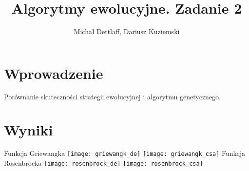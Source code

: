 \documentclass[11pt]{article}
\begin{document}
\title{Algorytmy ewolucyjne. Zadanie 2}
\author{Michał Dettlaff, Dariusz Kuziemski}
\maketitle

\section{Wprowadzenie}

\noindent
Porównanie skuteczności strategii ewolucyjnej i algorytmu genetycznego.

\section{Wyniki}

Funkcja Griewangka\newline
\texttt{[image: griewangk\_de]}\newline
\texttt{[image: griewangk\_csa]}
\newpage
Funkcja Rosenbrocka\newline
\texttt{[image: rosenbrock\_de]}\newline
\texttt{[image: rosenbrock\_csa]}\newline
\end{document}
